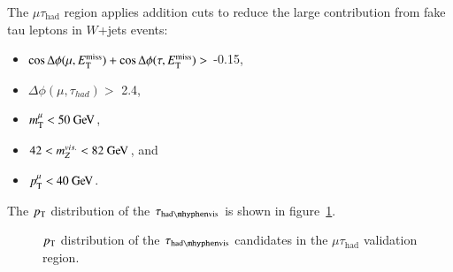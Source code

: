 The $\mu\tau_{\mathrm{had}}$ region applies addition cuts to reduce the large contribution from fake tau leptons in $W$+jets events:

\begin{itemize}
	\item $\cos{\Delta\phi(\mu, \ensuremath{E_{\text{T}}^{\text{miss}}})} + \cos{\Delta\phi(\tau, \ensuremath{E_{\text{T}}^{\text{miss}}})} >$ -0.15,
	\item $\Delta\phi(\mu, \tau_{had}) >$ 2.4,
	\item $m_{\mathrm{T}}^{\mu} < 50 \GeV$,
	\item $42< m_{Z}^{vis.} < 82 \GeV$, and
	\item $\pt^{\mu} < 40 \GeV$.
\end{itemize}

%
The $p_{\text{T}}$ distribution of the $\tauhadvis$ is shown in figure~\ref{fig:model-independent-VR-mutau}.
\begin{figure}[htbp]
  \centering
  \caption{$p_{\text{T}}$ distribution of the $\tauhadvis$ candidates in the $\mu\tau_{\mathrm{had}}$ validation region.}
  \label{fig:model-independent-VR-mutau}
\end{figure}



